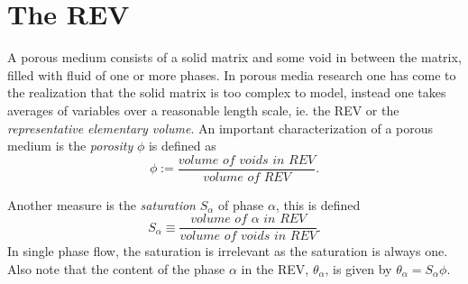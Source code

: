 \documentclass[../Main/main.tex]{subfiles}
\begin{document}
\graphicspath{{../Flow in porous media/figs/}}
\section*{The REV}\label{REV}
A porous medium consists of a solid matrix and some void in between the matrix, filled with fluid of one or more phases. In porous media research one has come to the realization that the solid matrix is too complex to model, instead one takes averages of variables over a reasonable length scale, ie. the REV or the \emph{representative elementary volume}.
An important characterization of a porous medium is the \emph{porosity} $\phi$ is defined as 
\begin{equation}
	\phi := \frac{\textit{volume of voids in REV}}{\textit{volume of REV}}.
\end{equation}

Another measure is the \emph{saturation} $S_{\alpha}$ of phase $\alpha$,  this is defined 
\begin{equation}
	S_{\alpha} \equiv \frac{\textit{volume of }\alpha \textit{ in REV}}{\textit{volume of voids in REV}}.
\end{equation}
In single phase flow, the saturation is irrelevant as the saturation is always one. Also note that the content of the phase $\alpha$ in the REV, $\theta_{\alpha}$, is given by $\theta_{\alpha} = S_{\alpha} \phi$.
\end{document}
